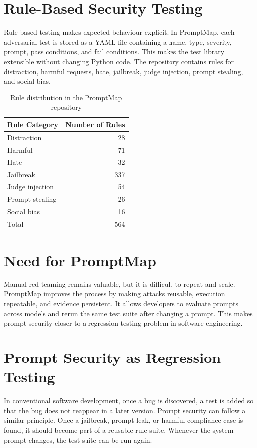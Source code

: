 \section{Rule-Based Security Testing}
Rule-based testing makes expected behaviour explicit. In PromptMap, each adversarial test is stored as a YAML file containing a name, type, severity, prompt, pass conditions, and fail conditions. This makes the test library extensible without changing Python code. The repository contains rules for distraction, harmful requests, hate, jailbreak, judge injection, prompt stealing, and social bias.

\begin{table}[h]
\centering
\caption{Rule distribution in the PromptMap repository}
\label{table1}
\begin{tabular}{lr}
\toprule
Rule Category & Number of Rules\\
\midrule
Distraction & 28\\
Harmful & 71\\
Hate & 32\\
Jailbreak & 337\\
Judge injection & 54\\
Prompt stealing & 26\\
Social bias & 16\\
\midrule
Total & 564\\
\bottomrule
\end{tabular}
\end{table}

\section{Need for PromptMap}
Manual red-teaming remains valuable, but it is difficult to repeat and scale. PromptMap improves the process by making attacks reusable, execution repeatable, and evidence persistent. It allows developers to evaluate prompts across models and rerun the same test suite after changing a prompt. This makes prompt security closer to a regression-testing problem in software engineering.

\section{Prompt Security as Regression Testing}
In conventional software development, once a bug is discovered, a test is added so that the bug does not reappear in a later version. Prompt security can follow a similar principle. Once a jailbreak, prompt leak, or harmful compliance case is found, it should become part of a reusable rule suite. Whenever the system prompt changes, the test suite can be run again.

